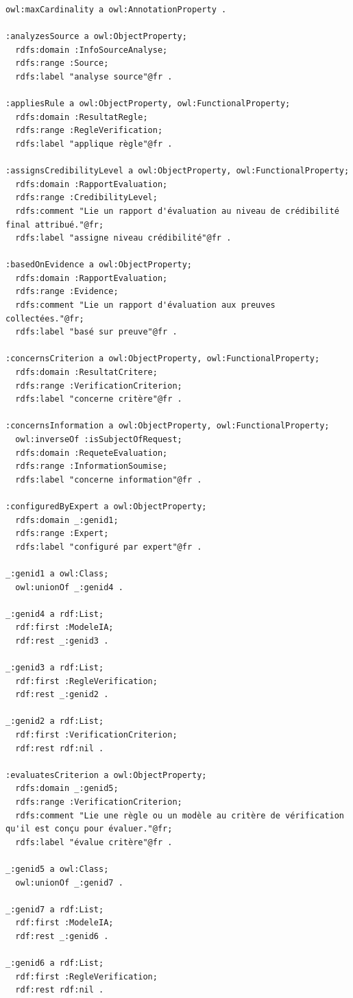 \documentclass[9pt,twocolumn,twoside,french]{article}
\begin{document}
\begin{lstlisting}[language=Turtle,basicstyle=\ttfamily\tiny,frame=single]
owl:maxCardinality a owl:AnnotationProperty .

:analyzesSource a owl:ObjectProperty;
  rdfs:domain :InfoSourceAnalyse;
  rdfs:range :Source;
  rdfs:label "analyse source"@fr .

:appliesRule a owl:ObjectProperty, owl:FunctionalProperty;
  rdfs:domain :ResultatRegle;
  rdfs:range :RegleVerification;
  rdfs:label "applique règle"@fr .

:assignsCredibilityLevel a owl:ObjectProperty, owl:FunctionalProperty;
  rdfs:domain :RapportEvaluation;
  rdfs:range :CredibilityLevel;
  rdfs:comment "Lie un rapport d'évaluation au niveau de crédibilité final attribué."@fr;
  rdfs:label "assigne niveau crédibilité"@fr .

:basedOnEvidence a owl:ObjectProperty;
  rdfs:domain :RapportEvaluation;
  rdfs:range :Evidence;
  rdfs:comment "Lie un rapport d'évaluation aux preuves collectées."@fr;
  rdfs:label "basé sur preuve"@fr .

:concernsCriterion a owl:ObjectProperty, owl:FunctionalProperty;
  rdfs:domain :ResultatCritere;
  rdfs:range :VerificationCriterion;
  rdfs:label "concerne critère"@fr .

:concernsInformation a owl:ObjectProperty, owl:FunctionalProperty;
  owl:inverseOf :isSubjectOfRequest;
  rdfs:domain :RequeteEvaluation;
  rdfs:range :InformationSoumise;
  rdfs:label "concerne information"@fr .

:configuredByExpert a owl:ObjectProperty;
  rdfs:domain _:genid1;
  rdfs:range :Expert;
  rdfs:label "configuré par expert"@fr .

_:genid1 a owl:Class;
  owl:unionOf _:genid4 .

_:genid4 a rdf:List;
  rdf:first :ModeleIA;
  rdf:rest _:genid3 .

_:genid3 a rdf:List;
  rdf:first :RegleVerification;
  rdf:rest _:genid2 .

_:genid2 a rdf:List;
  rdf:first :VerificationCriterion;
  rdf:rest rdf:nil .

:evaluatesCriterion a owl:ObjectProperty;
  rdfs:domain _:genid5;
  rdfs:range :VerificationCriterion;
  rdfs:comment "Lie une règle ou un modèle au critère de vérification qu'il est conçu pour évaluer."@fr;
  rdfs:label "évalue critère"@fr .

_:genid5 a owl:Class;
  owl:unionOf _:genid7 .

_:genid7 a rdf:List;
  rdf:first :ModeleIA;
  rdf:rest _:genid6 .

_:genid6 a rdf:List;
  rdf:first :RegleVerification;
  rdf:rest rdf:nil .


\end{lstlisting}
\end{document}
